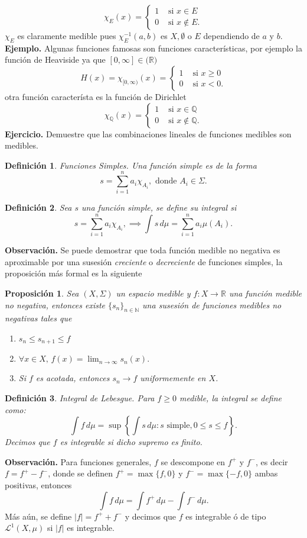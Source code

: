\documentclass[letterpaper]{book}
\newtheorem{prop}[teorema]{Proposici\'on}
\newtheorem{def.}{Definici\'on}[section]
\newcommand{\rac}{\ensuremath{ \mathbb Q }}
\newcommand{\nat}{\ensuremath{ \mathbb N }}
\newcommand{\exe}{{\noindent \sc \textbf{Ejercicio. }}}
\newcommand{\eje}{{\noindent \sc \textbf{Ejemplo. }}}
\newcommand{\obs}{{\noindent \sc \textbf{Observación. }}}
\newcommand{\sig}{\ensuremath{\Sigma}}
\newcommand{\re}{\ensuremath{\mathbb R }}
\begin{document}
\[
\chi_E(x)=
    \begin{cases}
        1 & \text{ si } x\in E \\
        0 & \text{ si } x\not\in E.
    \end{cases}
\]
\noindent $\chi_E$ es claramente medible pues $\chi_E^{-1}(a, b)$ es $X,\emptyset$ o $E$ dependiendo de $a$ y $b$.
\eje Algunas funciones famosas son funciones características, por ejemplo la función de Heaviside ya que $[0,\infty]\in\mathbb(\re)$
\[
H(x)=\chi_{[0,\infty)}(x)=
    \begin{cases}
        1 & \text{ si } x\geq 0 \\
        0 & \text{ si } x<0.
    \end{cases}
\]
\noindent otra función característa es la función de Dirichlet
\[
\chi_{\rac}(x)=
    \begin{cases}
        1 & \text{ si } x\in\rac \\
        0 & \text{ si } x\not\in\rac.
    \end{cases}
\]
\exe Demuestre que las combinaciones lineales de funciones medibles son medibles.
\begin{def.}{Funciones Simples.}
Una función \emph{simple} es de la forma
\[
s = \sum_{i=1}^n a_i \chi_{A_i},\text{ donde }A_i \in \sig.
\]
\end{def.}
\begin{def.}
Sea $s$ una función simple, se define su integral si
\[
s = \sum_{i=1}^n a_i \chi_{A_i},\implies\int s \, d\mu = \sum_{i=1}^n a_i \mu(A_i).
\]
\end{def.}
\obs Se puede demostrar que toda función medible no negativa es aproximable por una susesión \emph{creciente} o \emph{decreciente} de funciones simples, la proposición más formal es la siguiente
\begin{prop}
  Sea $(X,\sig)$ un espacio medible y $f:X\to\re$ una función medible no negativa, entonces existe $\{s_n\}_{n\in\nat}$ una susesión de funciones medibles no negativas tales que
  \begin{enumerate}
    \item $s_n\leq s_{n+1}\leq f$
    \item $\forall x \in X,\, f(x)=\lim_{n\to\infty}s_n(x).$
    \item Si $f$ es acotada, entonces $s_n\to f$ uniformemente en $X$.
  \end{enumerate}
  \end{prop}
\begin{def.}{Integral de Lebesgue.}
Para $f \geq 0$ medible, la integral se define como:
\[
\int f \, d\mu = \sup \left\{ \int s \, d\mu : s \text{ simple}, 0 \leq s \leq f \right\}.
\]
Decimos que $f$ es integrable si dicho supremo es finito.
\end{def.}
\obs Para funciones generales, $f$ se descompone en $f^+$ y $f^-$, es decir $f=f^{+}-f^{-}$, donde se definen $f^+=\max\{f,0\}$ y $f^{-}=\max\{-f,0\}$ ambas positivas, entonces
\[
\int f \, d\mu = \int f^{+}\,d\mu-\int f^{-}\,d\mu.
\]
Más aún, se define $|f|=f^{+}+f^{-}$ y decimos que $f$ es integrable ó de tipo $\mathcal{L}^1(X,\mu)$ si $|f|$ es integrable.
\end{document}
